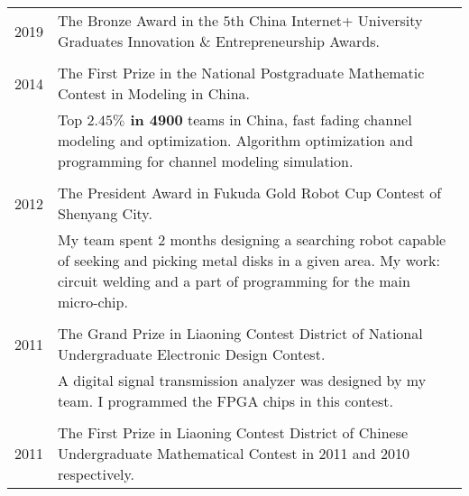 \documentclass[a4paper,10pt]{article}
\begin{document}
\begin{longtable}[H]{r|p{13.5cm}}
  \hspace{20pt} \textsc{2019} & The Bronze Award in the $5$th China Internet+ University Graduates Innovation \& Entrepreneurship Awards. \\
  \multicolumn{2}{c}{} \\
  \textsc{2014} & The First Prize in the National Postgraduate Mathematic Contest in Modeling in China.\\
                              & Top \textbf{$\mathbf{2.45\%}$ in 4900} teams in China, fast fading channel modeling and optimization. Algorithm optimization and programming for channel modeling simulation.\\
  \multicolumn{2}{c}{} \\

  \textsc{2012} & The President Award in Fukuda Gold Robot Cup Contest of Shenyang City. \\
                              & My team spent 2 months designing a searching robot capable of seeking and picking metal disks in a given area. My work: circuit welding and a part of programming for the main micro-chip. \\
  \multicolumn{2}{c}{} \\

  \textsc{2011} & The Grand Prize in Liaoning Contest District of National Undergraduate Electronic Design Contest. \\
                              & A digital signal transmission analyzer was designed by my team. I programmed the FPGA chips in this contest.\\
  \multicolumn{2}{c}{} \\

  \textsc{2011} & The First Prize in Liaoning Contest District of Chinese Undergraduate Mathematical Contest in 2011 and
                  2010 respectively. \\
\end{longtable}
\end{document}
